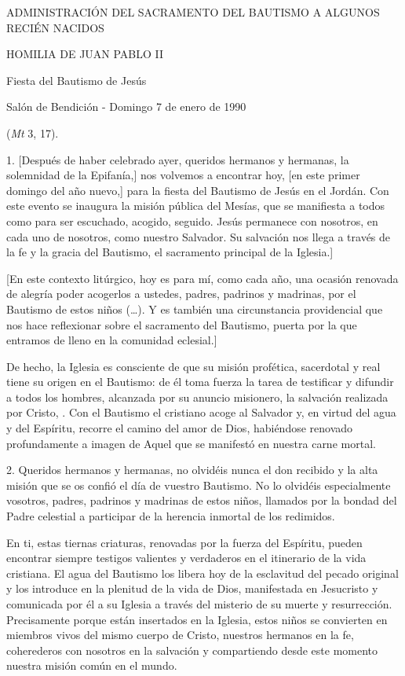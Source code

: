\begin{body}
	ADMINISTRACIÓN DEL SACRAMENTO DEL BAUTISMO A ALGUNOS RECIÉN NACIDOS

	HOMILIA DE JUAN PABLO II

	Fiesta del Bautismo de Jesús

	Salón de Bendición - Domingo 7 de enero de 1990

	 (\emph{Mt} 3, 17).

	1. {[}Después de haber celebrado ayer, queridos hermanos y hermanas, la solemnidad de la Epifanía,{]} nos volvemos a encontrar hoy, {[}en este primer domingo del año nuevo,{]} para la fiesta del Bautismo de Jesús en el Jordán. Con este evento se inaugura la misión pública del Mesías, que se manifiesta a todos como  para ser escuchado, acogido, seguido. Jesús permanece con nosotros, en cada uno de nosotros, como nuestro Salvador. Su salvación nos llega a través de la fe y la gracia del Bautismo, el sacramento principal de la Iglesia.{]}

	{[}En este contexto litúrgico, hoy es para mí, como cada año, una ocasión renovada de alegría poder acogerlos a ustedes, padres, padrinos y madrinas, por el Bautismo de estos niños (\ldots{}). Y es también una circunstancia providencial que nos hace reflexionar sobre el sacramento del Bautismo, puerta por la que entramos de lleno en la comunidad eclesial.{]}

	De hecho, la Iglesia es consciente de que su misión profética, sacerdotal y real tiene su origen en el Bautismo: de él toma fuerza la tarea de testificar y difundir a todos los hombres, alcanzada por su anuncio misionero, la salvación realizada por Cristo, . Con el Bautismo el cristiano acoge al Salvador y, en virtud del agua y del Espíritu, recorre el camino del amor de Dios, habiéndose renovado profundamente a imagen de Aquel que se manifestó en nuestra carne mortal.

	2. Queridos hermanos y hermanas, no olvidéis nunca el don recibido y la alta misión que se os confió el día de vuestro Bautismo. No lo olvidéis especialmente vosotros, padres, padrinos y madrinas de estos niños, llamados por la bondad del Padre celestial a participar de la herencia inmortal de los redimidos.

	En ti, estas tiernas criaturas, renovadas por la fuerza del Espíritu, pueden encontrar siempre testigos valientes y verdaderos  en el itinerario de la vida cristiana. El agua del Bautismo los libera hoy de la esclavitud del pecado original y los introduce en la plenitud de la vida de Dios, manifestada en Jesucristo y comunicada por él a su Iglesia a través del misterio de su muerte y resurrección. Precisamente porque están insertados en la Iglesia, estos niños se convierten en miembros vivos del mismo cuerpo de Cristo, nuestros hermanos en la fe, coherederos con nosotros en la salvación y compartiendo desde este momento nuestra misión común en el mundo.


\end{body}
